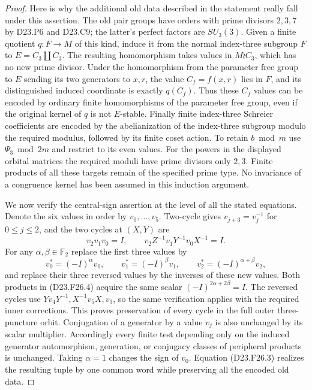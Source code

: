 \begin{proof}
Here is why the additional old data described in the statement
really fall under this assertion.  The old pair groups have
orders with prime divisors $2,3,7$ by D23.P6 and D23.C9;
the latter's perfect factors are $SU_3(3)$.  Given a finite
quotient $q:F\to M$ of this kind, induce it from the normal
index-three subgroup $F$ to $E=C_3\amalg C_3$.  The resulting
homomorphism takes values in $M\wr C_3$, which has no new
prime divisor.  Under the homomorphism from the parameter free
group to $E$ sending its two generators to $x,r$, the value
$C_f=f(x,r)$ lies in $F$, and its distinguished induced
coordinate is exactly $q(C_f)$.  Thus these $C_f$ values can
be encoded by ordinary finite homomorphisms of the parameter
free group, even if the original kernel of $q$ is not
$E$-stable.  Finally finite index-three Schreier coefficients
are encoded by the abelianization of the index-three subgroup
modulo the required modulus, followed by its finite coset
action.  To retain $b\bmod m$ use $\Psi_3\bmod2m$ and
restrict to its even values.  For the powers in the displayed
orbital matrices the required moduli have prime divisors
only $2,3$.  Finite products of all these targets remain of
the specified prime type.  No invariance of a congruence
kernel has been assumed in this induction argument.

We now verify the central-sign assertion at the level of all
the stated equations.  Denote the six values in order by
$v_0,\ldots,v_5$.  Two-cycle gives $v_{j+3}=v_j^{-1}$ for
$0\leq j\leq2$, and the two cycles at $(X,Y)$ are
\[
 v_2v_1v_0=I,\qquad
 v_2 Z^{-1}v_1Y^{-1}v_0X^{-1}=I.
\tag{D23.F26.4}
\]
For any $\alpha,\beta\in\mathbb F_2$ replace the first three
values by
\[
 v_0^*=(-I)^\alpha v_0,\qquad
 v_1^*=(-I)^\beta v_1,\qquad
 v_2^*=(-I)^{\alpha+\beta}v_2,
\tag{D23.F26.5}
\]
and replace their three reversed values by the inverses of
these new values.  Both products in (D23.F26.4) acquire the
same scalar $(-I)^{2\alpha+2\beta}=I$.
The reversed cycles use
$Yv_4Y^{-1},X^{-1}v_5X,v_3$, so the same verification applies
with the required inner corrections.  This proves preservation
of every cycle in the full outer three-puncture orbit.
Conjugation of a generator by a value $v_j$ is also unchanged
by its scalar multiplier.  Accordingly every finite test
depending only on the induced generator automorphism,
generation, or conjugacy classes of peripheral products is
unchanged.  Taking $\alpha=1$ changes the sign of $v_0$.
Equation (D23.F26.3) realizes the resulting tuple by one common
word while preserving all the encoded old data.


\end{proof}

